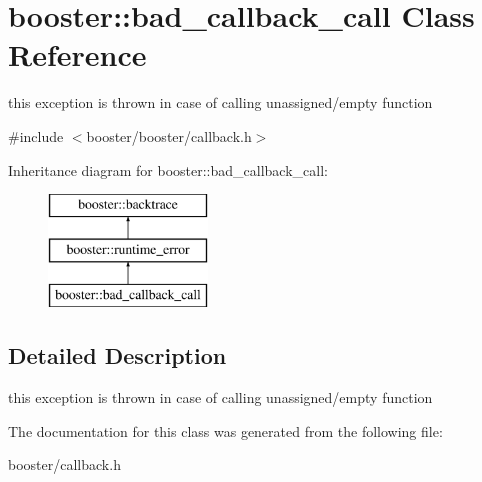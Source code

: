\section{booster\-:\-:bad\-\_\-callback\-\_\-call \-Class \-Reference}
\label{classbooster_1_1bad__callback__call}


this exception is thrown in case of calling unassigned/empty function  




{\ttfamily \#include $<$booster/booster/callback.\-h$>$}

\-Inheritance diagram for booster\-:\-:bad\-\_\-callback\-\_\-call\-:\begin{figure}[H]
\begin{center}
\leavevmode
\includegraphics[height=3.000000cm]{classbooster_1_1bad__callback__call}
\end{center}
\end{figure}


\subsection{\-Detailed \-Description}
this exception is thrown in case of calling unassigned/empty function 

\-The documentation for this class was generated from the following file\-:\begin{DoxyCompactItemize}
\item 
booster/callback.\-h\end{DoxyCompactItemize}

